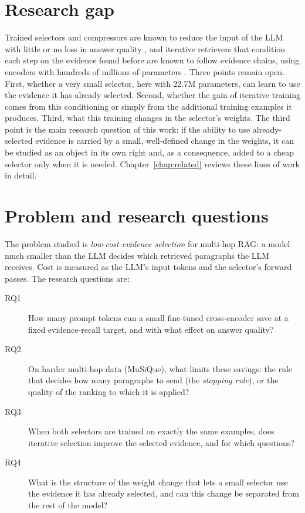 \section{Research gap}

Trained selectors and compressors are known to reduce the input of the LLM with little or no loss in answer quality \cite{xu2024recomp,chirkova2025provence}, and iterative retrievers that condition each step on the evidence found before are known to follow evidence chains, using encoders with hundreds of millions of parameters \cite{xiong2021mdr,zhang2024beamretrieval}. Three points remain open. First, whether a very small selector, here with 22.7M parameters, can learn to use the evidence it has already selected. Second, whether the gain of iterative training comes from this conditioning or simply from the additional training examples it produces. Third, what this training changes in the selector's weights. The third point is the main research question of this work: if the ability to use already-selected evidence is carried by a small, well-defined change in the weights, it can be studied as an object in its own right and, as a consequence, added to a cheap selector only when it is needed. Chapter~\ref{chap:related} reviews these lines of work in detail.

\section{Problem and research questions}

The problem studied is \emph{low-cost evidence selection} for multi-hop RAG: a model much smaller than the LLM decides which retrieved paragraphs the LLM receives. Cost is measured as the LLM's input tokens and the selector's forward passes. The research questions are:

\begin{description}
  \item[RQ1] How many prompt tokens can a small fine-tuned cross-encoder save at a fixed evidence-recall target, and with what effect on answer quality?
  \item[RQ2] On harder multi-hop data (MuSiQue), what limits these savings: the rule that decides how many paragraphs to send (the \emph{stopping rule}), or the quality of the ranking to which it is applied?
  \item[RQ3] When both selectors are trained on exactly the same examples, does iterative selection improve the selected evidence, and for which questions?
  \item[RQ4] What is the structure of the weight change that lets a small selector use the evidence it has already selected, and can this change be separated from the rest of the model?
\end{description}

